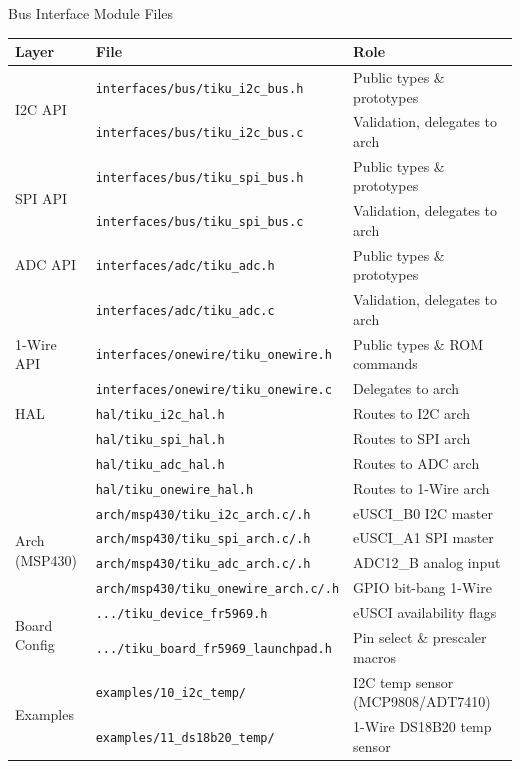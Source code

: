 \documentclass[aspectratio=169, 10pt]{beamer}
\begin{document}
\begin{frame}[fragile]{Bus Interface Module Files}
\begin{table}
\centering
\small
\begin{tabular}{@{}llp{5.5cm}@{}}
\toprule
\textbf{Layer} & \textbf{File} & \textbf{Role} \\
\midrule
\multirow{2}{*}{I2C API}
  & \texttt{interfaces/bus/tiku\_i2c\_bus.h} & Public types \& prototypes \\
  & \texttt{interfaces/bus/tiku\_i2c\_bus.c} & Validation, delegates to arch \\
\midrule
\multirow{2}{*}{SPI API}
  & \texttt{interfaces/bus/tiku\_spi\_bus.h} & Public types \& prototypes \\
  & \texttt{interfaces/bus/tiku\_spi\_bus.c} & Validation, delegates to arch \\
\midrule
ADC API
  & \texttt{interfaces/adc/tiku\_adc.h}  & Public types \& prototypes \\
  & \texttt{interfaces/adc/tiku\_adc.c}  & Validation, delegates to arch \\
\midrule
1-Wire API
  & \texttt{interfaces/onewire/tiku\_onewire.h}  & Public types \& ROM commands \\
  & \texttt{interfaces/onewire/tiku\_onewire.c}  & Delegates to arch \\
\midrule
HAL
  & \texttt{hal/tiku\_i2c\_hal.h} & Routes to I2C arch \\
  & \texttt{hal/tiku\_spi\_hal.h} & Routes to SPI arch \\
  & \texttt{hal/tiku\_adc\_hal.h} & Routes to ADC arch \\
  & \texttt{hal/tiku\_onewire\_hal.h} & Routes to 1-Wire arch \\
\midrule
\multirow{4}{*}{Arch (MSP430)}
  & \texttt{arch/msp430/tiku\_i2c\_arch.c/.h}  & eUSCI\_B0 I2C master \\
  & \texttt{arch/msp430/tiku\_spi\_arch.c/.h}  & eUSCI\_A1 SPI master \\
  & \texttt{arch/msp430/tiku\_adc\_arch.c/.h}  & ADC12\_B analog input \\
  & \texttt{arch/msp430/tiku\_onewire\_arch.c/.h}  & GPIO bit-bang 1-Wire \\
\midrule
\multirow{2}{*}{Board Config}
  & \texttt{.../tiku\_device\_fr5969.h}  & eUSCI availability flags \\
  & \texttt{.../tiku\_board\_fr5969\_launchpad.h}  & Pin select \& prescaler macros \\
\midrule
\multirow{2}{*}{Examples}
  & \texttt{examples/10\_i2c\_temp/}  & I2C temp sensor (MCP9808/ADT7410) \\
  & \texttt{examples/11\_ds18b20\_temp/}  & 1-Wire DS18B20 temp sensor \\
\bottomrule
\end{tabular}
\end{table}
\end{frame}
\end{document}
